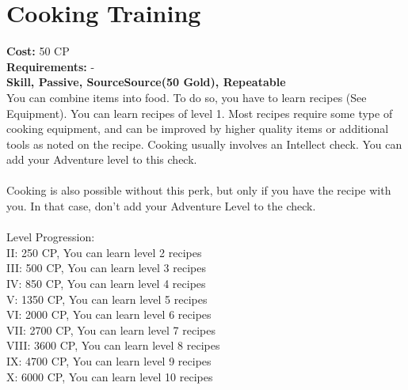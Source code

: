\section{Cooking Training}
\textbf{Cost:} 50 CP\\
\textbf{Requirements:} -\\
\textbf{Skill, Passive, SourceSource(50 Gold), Repeatable}\\
You can combine items into food. To do so, you have to learn recipes (See Equipment). You can learn recipes of level 1. Most recipes require some type of cooking equipment, and can be improved by higher quality items or additional tools as noted on the recipe. Cooking usually involves an Intellect check. You can add your Adventure level to this check. \\
\\
Cooking is also possible without this perk, but only if you have the recipe with you. In that case, don't add your Adventure Level to the check.\\
\\
Level Progression:\\
II: 250 CP, You can learn level 2 recipes\\
III: 500 CP, You can learn level 3 recipes\\
IV: 850 CP, You can learn level 4 recipes\\
V: 1350 CP, You can learn level 5 recipes\\
VI: 2000 CP, You can learn level 6 recipes\\
VII: 2700 CP, You can learn level 7 recipes\\
VIII: 3600 CP, You can learn level 8 recipes\\
IX: 4700 CP, You can learn level 9 recipes\\
X: 6000 CP, You can learn level 10 recipes\\